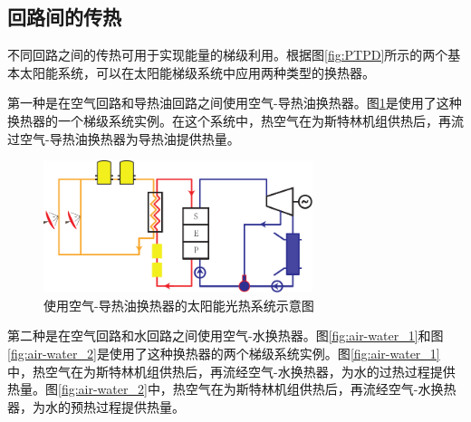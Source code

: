 \subsection{回路间的传热}
\label{sec:hebc}

不同回路之间的传热可用于实现能量的梯级利用。根据图\ref{fig:PTPD}所示的两个基本太阳能系统，可以在太阳能梯级系统中应用两种类型的换热器。

第一种是在空气回路和导热油回路之间使用空气-导热油换热器。图\ref{fig:air-oil}是使用了这种换热器的一个梯级系统实例。在这个系统中，热空气在为斯特林机组供热后，再流过空气-导热油换热器为导热油提供热量。

\begin{figure}[h]
\centering 
\includegraphics[width=0.7\textwidth]{fig/air-oil}
\caption{使用空气-导热油换热器的太阳能光热系统示意图}\label{fig:air-oil}
\end{figure}

第二种是在空气回路和水回路之间使用空气-水换热器。图\ref{fig:air-water_1}和图\ref{fig:air-water_2}是使用了这种换热器的两个梯级系统实例。图\ref{fig:air-water_1}中，热空气在为斯特林机组供热后，再流经空气-水换热器，为水的过热过程提供热量。图\ref{fig:air-water_2}中，热空气在为斯特林机组供热后，再流经空气-水换热器，为水的预热过程提供热量。

